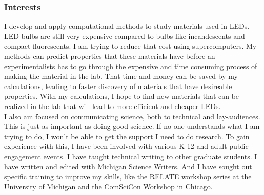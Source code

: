 
\subsubsection{Interests} 
I develop and apply computational methods to study materials
used in LEDs. LED bulbs are still very expensive compared to bulbs like
incandescents and compact-fluorescents. I am trying to reduce that cost using
supercomputers. My methods can predict properties that these materials have
before an experimentalists has to go through the expensive and time consuming
process of making the material in the lab. That time and money can be saved by
my calculations, leading to faster discovery of materials that have
desireable properties. With my calculations, I hope to find new materials that
can be realized in the lab that will lead to more efficient and cheaper LEDs. \\

I also am focused on communicating science, both to technical and lay-audiences.
This is just as important as doing good science. If no one understands what I am
trying to do, I won't be able to get the support I need to do research. To gain
experience with this, I have been involved with various K-12 and adult public
engagement events. I have taught technical writing to other graduate students. I
have written and edited with Michigan Science Writers. And I have sought out
specific training to improve my skills, like the RELATE workshop series at the
University of Michigan and the ComSciCon Workshop in Chicago.
